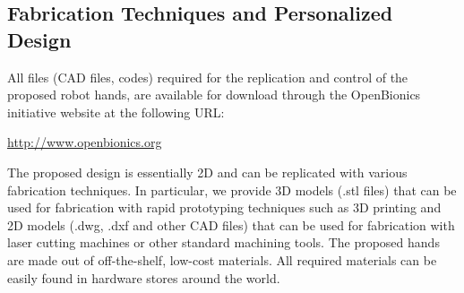 \subsection{Fabrication Techniques and Personalized Design}

All files (CAD files, codes) required for the replication and control of the proposed robot hands, are available for download through the OpenBionics initiative \cite{Liarokapis2014ASURRW} website at the following URL:
\begin{center}{\small{\url{http://www.openbionics.org}}}\end{center} 

 The proposed design is essentially 2D and can be replicated with various fabrication techniques. In particular, we provide 3D models (.stl files) that can be used for fabrication with rapid prototyping techniques such as 3D printing and 2D models (.dwg, .dxf and other CAD files) that can be used for fabrication with laser cutting machines or other standard machining tools. The proposed hands are made out of off-the-shelf, low-cost materials. All required materials can be easily found in hardware stores around the world. 

